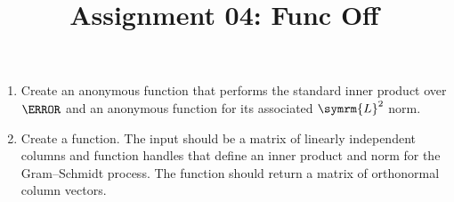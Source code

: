\documentclass{article}
\title{Assignment 04: Func Off}
\begin{document}
\renderTitle

\begin{enumerate}[leftmargin=*]
	\item
		Create an  anonymous function that performs
		the standard inner product over \(\C\) and an
		 anonymous function for its associated
		\(\symrm{L}^2\) norm.

	\item
		Create a  function.  The input
		should be a matrix of linearly independent columns and
		function handles that define an inner product and norm
		for the Gram–Schmidt process.  The function should
		return a matrix of orthonormal column vectors.
\end{enumerate}
\end{document}
